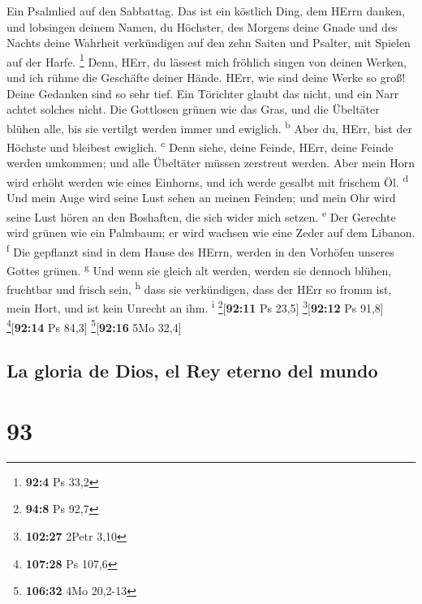  Ein Psalmlied auf den Sabbattag.  Das ist
ein köstlich Ding, dem HErrn danken, und lobsingen deinem Namen, du
Höchster,  des Morgens deine Gnade und des Nachts deine
Wahrheit verkündigen  auf den zehn Saiten und Psalter, mit
Spielen auf der Harfe. \footnote{\textbf{92:4} Ps 33,2} 
Denn, HErr, du lässest mich fröhlich singen von deinen Werken, und ich
rühme die Geschäfte deiner Hände.  HErr, wie sind deine
Werke so groß! Deine Gedanken sind so sehr tief.  Ein
Törichter glaubt das nicht, und ein Narr achtet solches nicht.
 Die Gottlosen grünen wie das Gras, und die Übeltäter
blühen alle, bis sie vertilgt werden immer und ewiglich.
\textsuperscript{b}  Aber du, HErr, bist der Höchste und
bleibest ewiglich. \textsuperscript{c}  Denn siehe, deine
Feinde, HErr, deine Feinde werden umkommen; und alle Übeltäter müssen
zerstreut werden.  Aber mein Horn wird erhöht werden wie
eines Einhorns, und ich werde gesalbt mit frischem Öl.
\textsuperscript{d}  Und mein Auge wird seine Lust sehen
an meinen Feinden; und mein Ohr wird seine Lust hören an den Boshaften,
die sich wider mich setzen. \textsuperscript{e}  Der
Gerechte wird grünen wie ein Palmbaum; er wird wachsen wie eine Zeder
auf dem Libanon. \textsuperscript{f}  Die gepflanzt sind
in dem Hause des HErrn, werden in den Vorhöfen unseres Gottes grünen.
\textsuperscript{g}  Und wenn sie gleich alt werden,
werden sie dennoch blühen, fruchtbar und frisch sein,
\textsuperscript{h}  dass sie verkündigen, dass der HErr
so fromm ist, mein Hort, und ist kein Unrecht an ihm.
\textsuperscript{i} \footnote{\textbf{94:8} Ps 92,7}{[}\textbf{92:11} Ps
23,5{]} \footnote{\textbf{102:27} 2Petr 3,10}{[}\textbf{92:12} Ps
91,8{]} \footnote{\textbf{107:28} Ps 107,6}{[}\textbf{92:14} Ps 84,3{]}
\footnote{\textbf{106:32} 4Mo 20,2-13}{[}\textbf{92:16} 5Mo 32,4{]}

\hypertarget{la-gloria-de-dios-el-rey-eterno-del-mundo}{%
\subsection{La gloria de Dios, el Rey eterno del
mundo}\label{la-gloria-de-dios-el-rey-eterno-del-mundo}}

\hypertarget{section-92}{%
\section{93}\label{section-92}}

